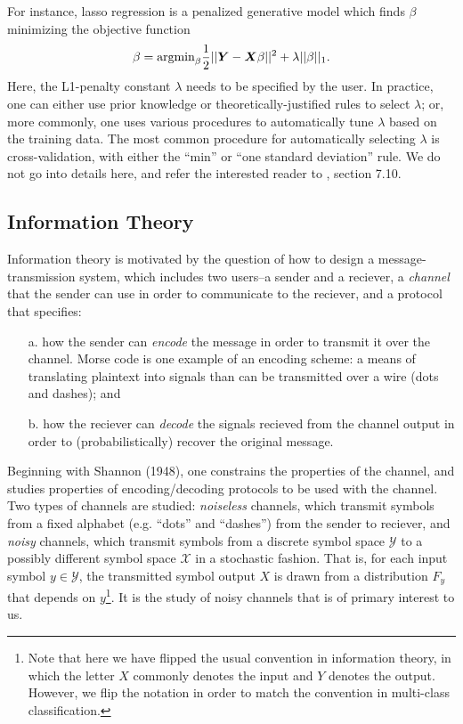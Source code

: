 For instance, lasso regression is a penalized generative model which
finds $\beta$ minimizing the objective function
\[
\beta = \text{argmin}_\beta \frac{1}{2}||\boldsymbol{Y} - \boldsymbol{X} \beta||^2 + \lambda ||\beta||_1.
\]
Here, the L1-penalty constant $\lambda$ needs to be specified by the
user.  In practice, one can either use prior knowledge or
theoretically-justified rules to select $\lambda$; or, more commonly,
one uses various procedures to automatically tune $\lambda$ based on
the training data.  The most common procedure for automatically
selecting $\lambda$ is cross-validation, with either the ``min'' or
``one standard deviation'' rule.  We do not go into details here, and
refer the interested reader to \cite{Hastie2009a}, section 7.10.

\subsection{Information Theory}\label{sec:intro_mi}

Information theory is motivated by the question of how to design a
message-transmission system, which includes two users--a sender and a
reciever, a \emph{channel} that the sender can use in order to
communicate to the reciever, and a protocol that specifies:
\begin{itemize}
\item[a.] how the sender can \emph{encode} the message in order to
  transmit it over the channel.  Morse code is one example of an
  encoding scheme: a means of translating plaintext into signals than
  can be transmitted over a wire (dots and dashes); and
\item[b.] how the reciever can \emph{decode} the signals recieved from
  the channel output in order to (probabilistically) recover the
  original message.
\end{itemize}

Beginning with Shannon (1948), one constrains the properties of the
channel, and studies properties of encoding/decoding protocols to be
used with the channel.  Two types of channels are studied:
\emph{noiseless} channels, which transmit symbols from a fixed
alphabet (e.g. ``dots'' and ``dashes'') from the sender to reciever,
and \emph{noisy} channels, which transmit symbols from a discrete
symbol space $\mathcal{Y}$ to a possibly different symbol space
$\mathcal{X}$ in a stochastic fashion.  That is, for each input symbol
$y \in \mathcal{Y}$, the transmitted symbol output $X$ is drawn from a
distribution $F_y$ that depends on $y$\footnote{Note that here we
  have flipped the usual convention in information theory, in which
  the letter $X$ commonly denotes the input and $Y$ denotes the
  output.  However, we flip the notation in order to match the
  convention in multi-class classification.}.  It is the study of
noisy channels that is of primary interest to us.

